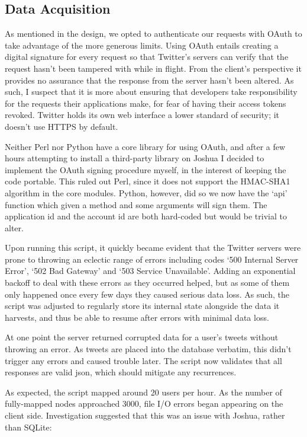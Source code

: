 \subsection{Data Acquisition}

As mentioned in the design, we opted to authenticate our requests with OAuth to take advantage of the more generous limits. Using OAuth entails creating a digital signature for every request so that Twitter's servers can verify that the request hasn't been tampered with while in flight. From the client's perspective it provides no assurance that the response from the server hasn't been altered. As such, I suspect that it is more about ensuring that developers take responsibility for the requests their applications make, for fear of having their access tokens revoked. Twitter holds its own web interface a lower standard of security; it doesn't use HTTPS by default.

Neither Perl nor Python have a core library for using OAuth, and after a few hours attempting to install a third-party library on Joshua I decided to implement the OAuth signing procedure myself, in the interest of keeping the code portable. This ruled out Perl, since it does not support the HMAC-SHA1 algorithm in the core modules. Python, however, did so we now have the `api' function which given a method and some arguments will sign them. The application id and the account id are both hard-coded but would be trivial to alter.

Upon running this script, it quickly became evident that the Twitter servers were prone to throwing an eclectic range of errors including codes `500 Internal Server Error', `502 Bad Gateway' and ‘503 Service Unavailable'. Adding an exponential backoff to deal with these errors as they occurred helped, but as some of them only happened once every few days they caused serious data loss. As such, the script was adjusted to regularly store its internal state alongside the data it harvests, and thus be able to resume after errors with minimal data loss.

At one point the server returned corrupted data for a user's tweets without throwing an error. As tweets are placed into the database verbatim, this didn't trigger any errors and caused trouble later. The script now validates that all responses are valid json, which should mitigate any recurrences.

As expected, the script mapped around 20 users per hour. As the number of fully-mapped nodes approached 3000, file I/O errors began appearing on the client side. Investigation suggested that this was an issue with Joshua, rather than SQLite:

